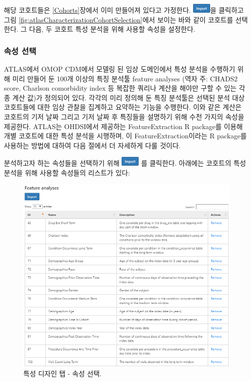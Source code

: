 \documentclass[11pt]{book}
\theoremstyle{definition}
\theoremstyle{definition}
\theoremstyle{definition}
\theoremstyle{remark}
\begin{document}
해당 코호트들은 \ref{Cohorts}장에서 이미 만들어져 있다고 가정한다.
\includegraphics{images/Characterization/atlasImportButton.png}을
클릭하고 그림 \ref{fig:atlasCharacterizationCohortSelection}에서 보이는
바와 같이 코호트를 선택한다. 그 다음, 두 코호트 특성 분석을 위해 사용할
속성을 설정한다.

\subsubsection*{속성 선택}\label{-}

ATLAS에서 OMOP CDM에서 모델링 된 임상 도메인에서 특성 분석을 수행하기
위해 미리 만들어 둔 100개 이상의 특징 분석툴 feature analyses (역자 주:
CHADS2 score, Charlson comorbidity index 등 복잡한 쿼리나 계산을 해야만
구할 수 있는 각종 계산 값)가 정의되어 있다. 각각의 미리 정의해 둔 특징
분석툴은 선택된 분석 대상 코호트들에 대한 임상 관찰을 집계하고 요약하는
기능을 수행한다. 이와 같은 계산은 코호트의 기저 날짜 그리고 기저 날짜 후
특징들을 설명하기 위해 수천 가지의 속성을 제공한다. ATLAS는 OHDSI에서
제공하는 FeatureExtraction R package를 이용해 개별 코호트에 대한 특성
분석을 시행하며, 이 FeatureExtraction이라는 R package를 사용하는 방법에
대하여 다음 절에서 더 자세하게 다룰 것이다. 

분석하고자 하는 속성들을 선택하기 위해
\includegraphics{images/Characterization/atlasImportButton.png} 를
클릭한다. 아래에는 코호트의 특성 분석을 위해 사용할 속성들의 리스트가
있다:

\begin{figure}

{\centering \includegraphics[width=1\linewidth]{images/Characterization/atlasCharacterizationFeatureSelection} 

}

\caption{특성 디자인 탭 - 속성 선택.}\label{fig:atlasCharacterizationFeatureSelection}
\end{figure}
\end{document}
